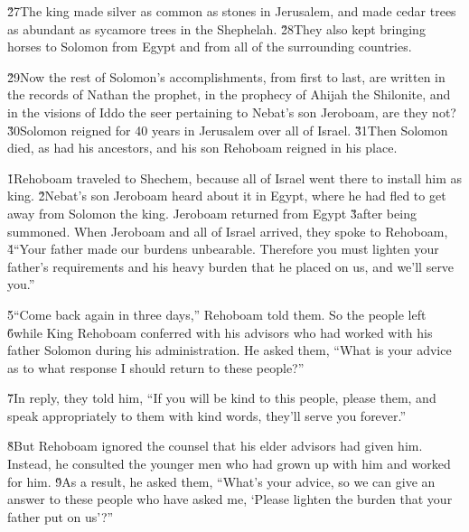 \v{27}The king made silver as common as stones in Jerusalem, and made cedar trees as abundant as sycamore trees in the Shephelah. \v{28}They also kept bringing horses to Solomon from Egypt and from all of the surrounding countries.

\v{29}Now the rest of Solomon's accomplishments, from first to last, are written in the records of Nathan the prophet, in the prophecy of Ahijah the Shilonite, and in the visions of Iddo the seer pertaining to Nebat's son Jeroboam, are they not? \v{30}Solomon reigned for 40 years in Jerusalem over all of Israel. \v{31}Then Solomon died, as had his ancestors, and his son Rehoboam reigned in his place.

\v{1}Rehoboam traveled to Shechem, because all of Israel went there to install him as king. \v{2}Nebat's son Jeroboam heard about it in Egypt, where he had fled to get away from Solomon the king. Jeroboam returned from Egypt \v{3}after being summoned. When Jeroboam and all of Israel arrived, they spoke to Rehoboam, \v{4}``Your father made our burdens unbearable. Therefore you must lighten your father's requirements and his heavy burden that he placed on us, and we'll serve you.''

\v{5}``Come back again in three days,'' Rehoboam told them. So the people left \v{6}while King Rehoboam conferred with his advisors who had worked with his father Solomon during his administration. He asked them, ``What is your advice as to what response I should return to these people?''

\v{7}In reply, they told him, ``If you will be kind to this people, please them, and speak appropriately to them with kind words, they'll serve you forever.''

\v{8}But Rehoboam ignored the counsel that his elder advisors had given him. Instead, he consulted the younger men who had grown up with him and worked for him. \v{9}As a result, he asked them, ``What's your advice, so we can give an answer to these people who have asked me, `Please lighten the burden that your father put on us'?''

